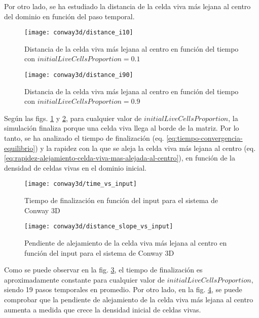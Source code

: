 Por otro lado, se ha estudiado la distancia de la celda viva más lejana al centro del dominio en función del
paso temporal.

\begin{figure}[H]
    \centering
    \texttt{[image: conway3d/distance\_i10]}
    \caption{Distancia de la celda viva más lejana al centro en función del tiempo con $initialLiveCellsProportion = 0.1$}
    \label{fig:conway3d_d10}
\end{figure}
\begin{figure}[H]
    \centering
    \texttt{[image: conway3d/distance\_i90]}
    \caption{Distancia de la celda viva más lejana al centro en función del tiempo con $initialLiveCellsProportion = 0.9$}
    \label{fig:conway3d_d90}
\end{figure}

Según las figs. \ref{fig:conway3d_d10} y \ref{fig:conway3d_d90}, para cualquier valor de $initialLiveCellsProportion$,
la simulación finaliza porque una celda viva llega al borde de la matriz.
Por lo tanto, se ha analizado el tiempo de finalización (eq. \ref{eq:tiempo-convergencia-equilibrio}) y la
rapidez con la que se aleja la celda viva más lejana al centro
(eq. \ref{eq:rapidez-alejamiento-celda-viva-mas-alejada-al-centro}), en función de la densidad de celdas vivas
en el dominio inicial.

\begin{figure}[H]
    \centering
    \texttt{[image: conway3d/time\_vs\_input]}
    \caption{Tiempo de finalización en función del input para el sistema de Conway 3D}
    \label{fig:conway3d_time_vs_input}
\end{figure}
\begin{figure}[H]
    \centering
    \texttt{[image: conway3d/distance\_slope\_vs\_input]}
    \caption{Pendiente de alejamiento de la celda viva más lejana al centro en función del input para el sistema de Conway 3D}
    \label{fig:conway3d_distance_slope_vs_input}
\end{figure}

Como se puede observar en la fig. \ref{fig:conway3d_time_vs_input}, el tiempo de finalización es
aproximadamente constante para cualquier valor de $initialLiveCellsProportion$, siendo 19 pasos temporales en promedio.
Por otro lado, en la fig. \ref{fig:conway3d_distance_slope_vs_input}, se puede comprobar que la pendiente de alejamiento
de la celda viva más lejana al centro aumenta a medida que crece la densidad inicial de celdas vivas.


